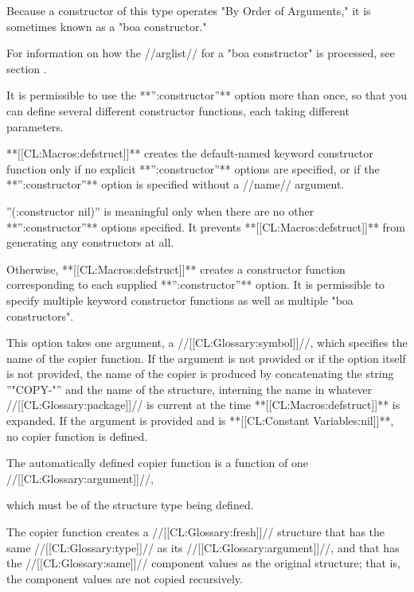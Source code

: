 Because a constructor of this type operates "By Order of Arguments," it is sometimes known as a "boa constructor."

For information on how the //arglist// for a "boa constructor" is processed, see section {\secref\BoaLambdaLists}.

It is permissible to use the **'':constructor''** option more than once, so that you can define several different constructor functions, each taking different parameters.


**[[CL:Macros:defstruct]]** creates the default-named keyword constructor function only if no explicit **'':constructor''** options are specified, or if the **'':constructor''** option is specified without a //name// argument.

''(:constructor nil)'' is meaningful only when there are no other **'':constructor''** options specified. It prevents **[[CL:Macros:defstruct]]** from generating any constructors at all.

Otherwise, **[[CL:Macros:defstruct]]** creates a constructor function corresponding to each supplied **'':constructor''** option. It is permissible to specify multiple keyword constructor functions as well as multiple "boa constructors".


This option takes one argument, a //[[CL:Glossary:symbol]]//, which specifies the name of the copier function. If the argument is not provided or if the option itself is not provided, the name of the copier is produced by concatenating the string ''"COPY-"'' and the name of the structure, interning the name in whatever //[[CL:Glossary:package]]// is current at the time **[[CL:Macros:defstruct]]** is expanded. If the argument is provided and is **[[CL:Constant Variables:nil]]**, no copier function is defined.

The automatically defined copier function is a function of one //[[CL:Glossary:argument]]//,

which must be of the structure type being defined.

The copier function creates a //[[CL:Glossary:fresh]]// structure that has the same //[[CL:Glossary:type]]// as its //[[CL:Glossary:argument]]//, and that has the //[[CL:Glossary:same]]// component values as the original structure; that is, the component values are not copied recursively.

